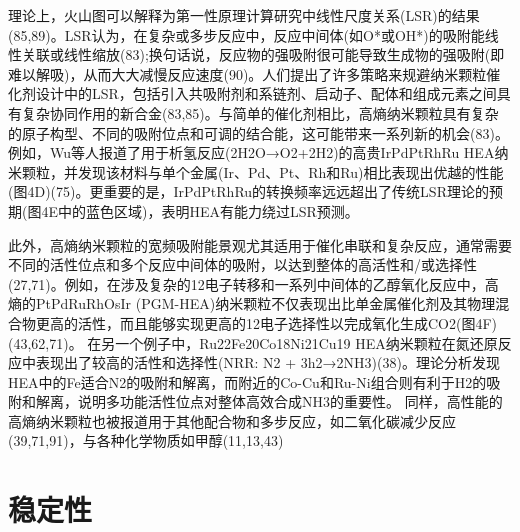 \documentclass[a4paper]{article}
\begin{document}
理论上，火山图可以解释为第一性原理计算研究中线性尺度关系(LSR)的结果(85,89)。LSR认为，在复杂或多步反应中，反应中间体(如O*或OH*)的吸附能线性关联或线性缩放(83);换句话说，反应物的强吸附很可能导致生成物的强吸附(即难以解吸)，从而大大减慢反应速度(90)。人们提出了许多策略来规避纳米颗粒催化剂设计中的LSR，包括引入共吸附剂和系链剂、启动子、配体和组成元素之间具有复杂协同作用的新合金(83,85)。与简单的催化剂相比，高熵纳米颗粒具有复杂的原子构型、不同的吸附位点和可调的结合能，这可能带来一系列新的机会(83)。例如，Wu等人报道了用于析氢反应(2H2O→O2+2H2)的高贵IrPdPtRhRu HEA纳米颗粒，并发现该材料与单个金属(Ir、Pd、Pt、Rh和Ru)相比表现出优越的性能(图4D)(75)。更重要的是，IrPdPtRhRu的转换频率远远超出了传统LSR理论的预期(图4E中的蓝色区域)，表明HEA有能力绕过LSR预测。



此外，高熵纳米颗粒的宽频吸附能景观尤其适用于催化串联和复杂反应，通常需要不同的活性位点和多个反应中间体的吸附，以达到整体的高活性和/或选择性(27,71)。例如，在涉及复杂的12电子转移和一系列中间体的乙醇氧化反应中，高熵的PtPdRuRhOsIr (PGM-HEA)纳米颗粒不仅表现出比单金属催化剂及其物理混合物更高的活性，而且能够实现更高的12电子选择性以完成氧化生成CO2(图4F)(43,62,71)。
在另一个例子中，Ru22Fe20Co18Ni21Cu19 HEA纳米颗粒在氮还原反应中表现出了较高的活性和选择性(NRR: N2 + 3h2→2NH3)(38)。理论分析发现HEA中的Fe适合N2的吸附和解离，而附近的Co-Cu和Ru-Ni组合则有利于H2的吸附和解离，说明多功能活性位点对整体高效合成NH3的重要性。
同样，高性能的高熵纳米颗粒也被报道用于其他配合物和多步反应，如二氧化碳减少反应(39,71,91)，与各种化学物质如甲醇(11,13,43)


\section*{稳定性}
\end{document}
